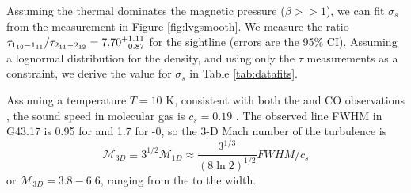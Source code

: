 


Assuming the thermal dominates the magnetic pressure ($\beta>>1$), we can fit
$\sigma_s$ from the measurement in Figure \ref{fig:lvgsmooth}.  We  measure the
ratio $\tau_{1_{10}-1_{11}}/\tau_{2_{11}-2_{12}} = 7.70^{+1.11}_{-0.87} $ for the \north
sightline (errors are the 95\% CI).  Assuming a lognormal distribution for the
density, and using only the $\tau$ measurements as a constraint, we derive the
value for $\sigma_s$ in Table \ref{tab:datafits}.

Assuming a temperature $T=10$ K, consistent with both the \formaldehyde and CO
observations \citep{Plume2004a}, the sound speed in molecular gas is $c_s=0.19$
\kms.  The observed line FWHM in G43.17 is 0.95 \kms for \formaldehyde and 1.7 \kms for
-0,
so the 3-D Mach number of the turbulence is
$$\mathcal{M}_{3D} \equiv 3^{1/2} \mathcal{M}_{1D} \approx \frac{3^{1/3}}{(8\ln 2)^{1/2}} FWHM / c_s $$
or $\mathcal{M}_{3D} = 3.8 - 6.6 $, ranging from the \formaldehyde to the \thirteenco width.


